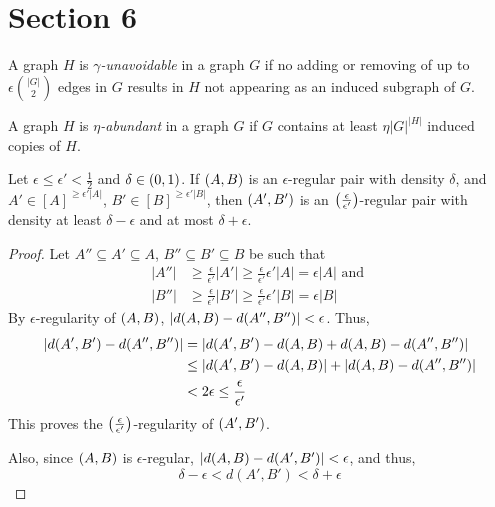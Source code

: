 \section{Section 6} \label{sec:section_6}
     \label{def:unavoidable}
        A graph $H$ is \emph{$\gamma$-unavoidable} in a graph $G$ if no adding or removing of up to $\epsilon {|G| \choose 2}$
        edges in $G$ results in $H$ not appearing as an induced subgraph of $G$.

     \label{def:abundant}
        A graph $H$ is \emph{$\eta$-abundant} in a graph $G$ if $G$ contains at least $\eta |G|^{|H|}$
        induced copies of $H$.

     \label{lem:regularity_is_transitive}
        Let $\epsilon \leq \epsilon' < \frac{1}{2}$ and $\delta \in \left( 0, 1 \right)$.
        If $\left( A,B \right)$ is an $\epsilon$-regular pair with density $\delta$, and $A' \in [A]^{\geq \epsilon' |A|}$,
        $B' \in [B]^{\geq \epsilon' |B|}$, then $\left( A', B' \right)$ is an $\left( \frac{\epsilon}{\epsilon'} \right)$-regular
        pair with density at least $\delta - \epsilon$ and at most $\delta + \epsilon$.
        \begin{proof}
            Let $A'' \subseteq A' \subseteq A$, $B'' \subseteq B' \subseteq B$ be such that
            \begin{align*}
                |A''| & \geq \frac{\epsilon}{\epsilon'} |A'| \geq \frac{\epsilon}{\epsilon'} \epsilon' |A| = \epsilon |A|
                \text{ and } \\
                |B''| & \geq \frac{\epsilon}{\epsilon'} |B'| \geq \frac{\epsilon}{\epsilon'} \epsilon' |B| = \epsilon |B|
            \end{align*}
            By $\epsilon$-regularity of $\left( A,B \right)$, $\left| d(A,B) - d(A'',B'') \right| < \epsilon$.
            Thus,
            \begin{align*}
                \left| d(A',B') - d(A'',B'') \right|
                    & = \left| d(A',B') - d(A,B) + d(A,B) - d(A'',B'') \right| \\
                    & \leq \left| d(A',B') - d(A,B) \right| + \left| d(A,B) - d(A'',B'') \right| \\
                    & < 2 \epsilon \leq \frac{\epsilon}{\epsilon'}
            \end{align*}
            This proves the $\left( \frac{\epsilon}{\epsilon'} \right)$-regularity of $\left( A',B' \right)$.

            Also, since $\left( A,B \right)$ is $\epsilon$-regular, $\left| d(A,B) - d(A',B') \right| < \epsilon$,
            and thus,
            \[
                \delta - \epsilon < d(A',B') < \delta + \epsilon
            \]
        \end{proof}

